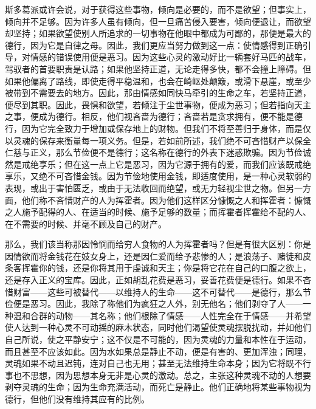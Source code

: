 斯多葛派或许会说，对于获得这些事物，倾向是必要的，而不是欲望；但事实上，倾向并不足够。因为许多人虽有倾向，但一旦痛苦侵入要害，倾向便退让，而欲望却坚持；如果欲望使别人所追求的一切事物在他眼中都成为可鄙的，那便是最大的德行，因为它是自律之母。因此，我们更应当努力做到这一点：使情感得到正确引导，对情感的错误使用便是恶习。因为这些心灵的激动好比一辆套好马匹的战车，驾驭者的首要职责是认路；如果他坚持正道，无论走得多快，都不会撞上障碍。但如果他偏离了路线，即使走得平稳温和，也会在崎岖处颠簸，或滑下悬崖，或至少被带到不需要去的地方。因此，那由情感如同快马牵引的生命之车，若坚持正道，便尽到其职。因此，畏惧和欲望，若倾注于尘世事物，便成为恶习；但若指向天主之事，便成为德行。相反，他们视吝啬为德行；吝啬若是贪求拥有，便不能是德行，因为它完全致力于增加或保存地上的财物。但我们不将至善归于身体，而是仅以灵魂的保存来衡量每一项义务。但是，若如前所述，我们绝不可吝惜财产以保全仁慈与正义，那么节俭便不是德行；这名称在德行的外表下迷惑欺骗。因为节俭诚然是戒绝享乐；但在这一点上它是恶习，因为它源于拥有的爱，而我们应该既戒绝享乐，又绝不可吝惜金钱。因为节俭地使用金钱，即适度使用，是一种心灵软弱的表现，或出于害怕匮乏，或由于无法收回而绝望，或无力轻视尘世之物。但另一方面，他们称不吝惜财产的人为挥霍者。因为他们这样区分慷慨之人和挥霍者：慷慨之人施予配得的人、在适当的时候、施予足够的数量；而挥霍者挥霍给不配的人、在不需要的时候、并毫不顾及自己的财产。\par

那么，我们该当称那因怜悯而给穷人食物的人为挥霍者吗？但是有很大区别：你是因情欲而将金钱花在妓女身上，还是因仁爱而给予悲惨的人；是浪荡子、赌徒和皮条客挥霍你的钱，还是你将其用于虔诚和天主；你是将它花在自己的口腹之欲上，还是存入正义的宝库。因此，正如胡乱花费是恶习，妥善花费便是德行。如果不吝惜财富——这些可被替代——以维持人的生命——这不可替代——是德行，那么节俭便是恶习。因此，我除了称他们为疯狂之人外，别无他名；他们剥夺了人——一种温和合群的动物——其名称；他们根除了情感——人性完全在于情感——并希望使人达到一种心灵不可动摇的麻木状态，同时他们渴望使灵魂摆脱扰动，并如他们自己所说，使之平静安宁；这不仅是不可能的，因为灵魂的力量和本性在于运动，而且甚至不应该如此。因为水如果总是静止不动，便是有害的、更加浑浊；同理，灵魂如果不动且迟钝，连对自己也无用；甚至无法维持生命本身；因为它将既不行事也不思想，因为思想本身无非是心灵的激动。总之，主张这种灵魂不动的人想要剥夺灵魂的生命；因为生命充满活动，而死亡是静止。他们正确地将某些事物视为德行，但他们没有维持其应有的比例。\par

